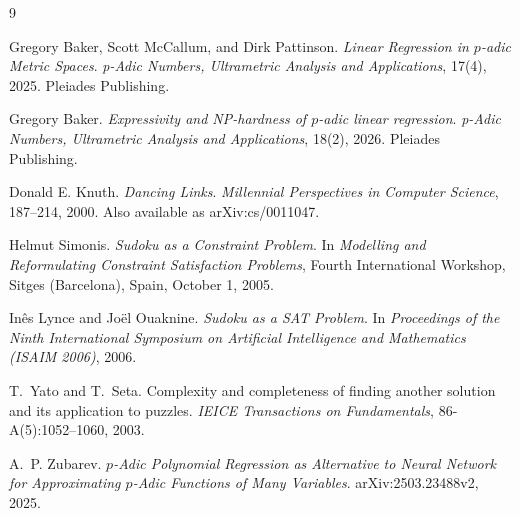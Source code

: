 \documentclass[11pt]{article}
\begin{document}
\begin{thebibliography}{9}

Gregory Baker, Scott McCallum, and Dirk Pattinson.
\newblock \emph{Linear Regression in $p$-adic Metric Spaces}.
\newblock \emph{p-Adic Numbers, Ultrametric Analysis and Applications}, 17(4), 2025.
\newblock Pleiades Publishing.

Gregory Baker.
\newblock \emph{Expressivity and NP-hardness of $p$-adic linear regression}.
\newblock \emph{p-Adic Numbers, Ultrametric Analysis and Applications}, 18(2), 2026.
\newblock Pleiades Publishing.

Donald E. Knuth.
\newblock \emph{Dancing Links}.
\newblock \emph{Millennial Perspectives in Computer Science}, 187--214, 2000.
\newblock Also available as arXiv:cs/0011047.

Helmut Simonis.
\newblock \emph{Sudoku as a Constraint Problem}.
\newblock In \emph{Modelling and Reformulating Constraint Satisfaction Problems}, Fourth International Workshop, Sitges (Barcelona), Spain, October 1, 2005.

In\^es Lynce and Jo\"el Ouaknine.
\newblock \emph{Sudoku as a {SAT} Problem}.
\newblock In \emph{Proceedings of the Ninth International Symposium on Artificial Intelligence and Mathematics (ISAIM 2006)}, 2006.

T.~Yato and T.~Seta.
\newblock Complexity and completeness of finding another solution and its application to puzzles.
\newblock \emph{IEICE Transactions on Fundamentals}, 86-A(5):1052--1060, 2003.

A.~P. Zubarev.
\newblock \emph{$p$-Adic Polynomial Regression as Alternative to Neural Network for Approximating $p$-Adic Functions of Many Variables}.
\newblock arXiv:2503.23488v2, 2025.

\end{thebibliography}
\end{document}
